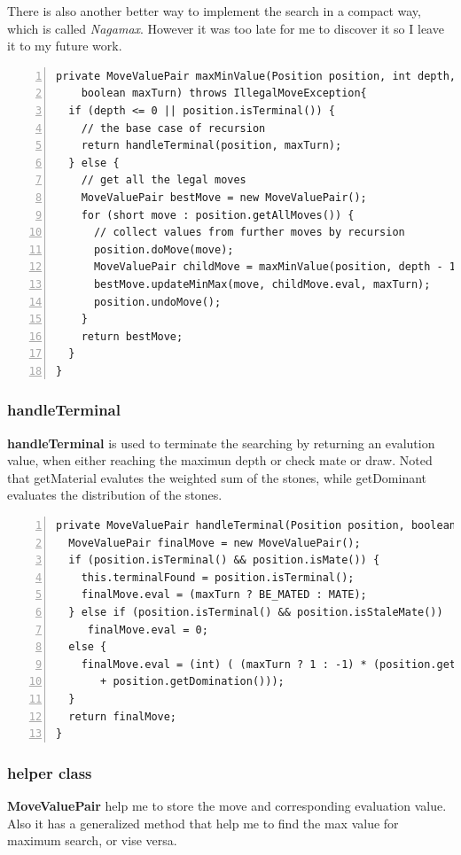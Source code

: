 \documentclass{article}
\begin{document}
There is also another better way to implement the search in a compact way, which is called \emph{Nagamax}. However it was too late for me to discover it so I leave it to my future work.

\begin{lstlisting}[numbers=left]
private MoveValuePair maxMinValue(Position position, int depth, 
    boolean maxTurn) throws IllegalMoveException{
  if (depth <= 0 || position.isTerminal()) {
    // the base case of recursion
    return handleTerminal(position, maxTurn);
  } else {
    // get all the legal moves
    MoveValuePair bestMove = new MoveValuePair();
    for (short move : position.getAllMoves()) {
      // collect values from further moves by recursion
      position.doMove(move);
      MoveValuePair childMove = maxMinValue(position, depth - 1, !maxTurn);
      bestMove.updateMinMax(move, childMove.eval, maxTurn);
      position.undoMove();
    }
    return bestMove;
  }
}
\end{lstlisting}

\subsubsection{handleTerminal}

\textbf{handleTerminal} is used to terminate the searching by returning an evalution value, when either reaching the maximun depth or check mate or draw. Noted that getMaterial evalutes the weighted sum of the stones, while getDominant evaluates the distribution of the stones.

\begin{lstlisting}[numbers=left]
private MoveValuePair handleTerminal(Position position, boolean maxTurn) {
  MoveValuePair finalMove = new MoveValuePair();
  if (position.isTerminal() && position.isMate()) {
    this.terminalFound = position.isTerminal();
    finalMove.eval = (maxTurn ? BE_MATED : MATE);
  } else if (position.isTerminal() && position.isStaleMate())
     finalMove.eval = 0;
  else {
    finalMove.eval = (int) ( (maxTurn ? 1 : -1) * (position.getMaterial() 
       + position.getDomination()));
  }
  return finalMove;
}
\end{lstlisting}

\subsubsection{helper class}

\textbf{MoveValuePair} help me to store the move and corresponding evaluation value. Also it has a generalized method that help me to find the max value for maximum search, or vise versa.
\end{document}
